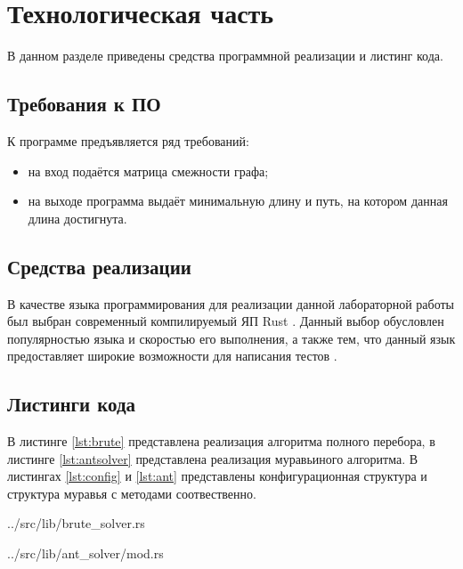 \chapter{Технологическая часть}

В данном разделе приведены средства программной реализации и листинг кода.

\section{Требования к ПО}

К программе предъявляется ряд требований:
\begin{itemize}
    \item на вход подаётся матрица смежности графа;
    \item на выходе программа выдаёт минимальную длину и путь, на котором данная длина достигнута.
\end{itemize}

\section{Средства реализации}

В качестве языка программирования для реализации данной лабораторной работы был выбран современный компилируемый ЯП Rust \cite{rustlang}. Данный выбор обусловлен популярностью языка и скоростью его выполнения, а также тем, что данный язык предоставляет широкие возможности для написания тестов \cite{rusttest}.

\section{Листинги кода}

В листинге \ref{lst:brute} представлена реализация алгоритма полного перебора, в листинге \ref{lst:antsolver} представлена реализация муравьиного алгоритма. В листингах \ref{lst:config} и \ref{lst:ant} представлены конфигурационная структура и структура муравья с методами соотвественно.

\begin{lstinputlisting}[
        caption={Реализация полного перебора.},
        label={lst:brute},
        style={rust}
    ]{../src/lib/brute_solver.rs}
\end{lstinputlisting}

\begin{lstinputlisting}[
        caption={Реализация муравьиного алгоритма.},
        label={lst:antsolver},
        style={rust}
    ]{../src/lib/ant_solver/mod.rs}
\end{lstinputlisting}

